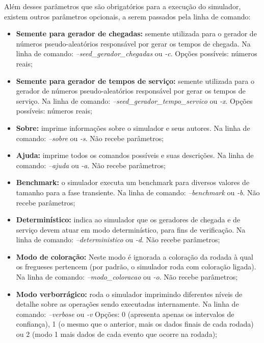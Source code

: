 \documentclass[a4paper,10pt]{article}
\begin{document}
    Além desses parâmetros que são obrigatórios para a execução do simulador, existem outros parâmetros opcionais, a serem passados pela linha de comando:

\begin {itemize}
\item \textbf{Semente para gerador de chegadas:} semente utilizada para o gerador de números pseudo-aleatórios responsável por gerar os tempos de chegada. Na linha de comando: \emph{--seed\_gerador\_chegadas} ou \emph{-c}. Opções possíveis: números reais;

\item \textbf{Semente para gerador de tempos de serviço:} semente utilizada para o gerador de números pseudo-aleatórios responsável por gerar os tempos de serviço. Na linha de comando: \emph{--seed\_gerador\_tempo\_servico} ou \emph{-x}. Opções possíveis: números reais;

\item \textbf{Sobre:} imprime informações sobre o simulador e seus autores. Na linha de comando: \emph{--sobre} ou \emph{-s}. Não recebe parâmetros;

\item \textbf{Ajuda:} imprime todos os comandos possíveis e suas descrições. Na linha de comando: \emph{--ajuda} ou \emph{-a}. Não recebe parâmetros;

\item \textbf{Benchmark:} o simulador executa um benchmark para diversos valores de tamanho para a fase transiente. Na linha de comando: \emph{--benchmark} ou \emph{-b}. Não recebe parâmetros;

\item \textbf{Determinístico:} indica ao simulador que os geradores de chegada e de serviço devem atuar em modo determinístico, para fins de verificação. Na linha de comando: \emph{--deterministico} ou \emph{-d}. Não recebe parâmetros;

\item \textbf{Modo de coloração:} Neste modo é ignorada a coloração da rodada à qual os fregueses pertencem (por padrão, o simulador roda com coloração ligada). Na linha de comando: \emph{--modo\_coloracao} ou \emph{-o}. Não recebe parâmetros;


\item \textbf{Modo verborrágico:} roda o simulador imprimindo diferentes níveis de detalhe sobre as operações sendo executadas internamente. Na linha de comando: \emph{--verbose} ou \emph{-v} Opções: 0 (apresenta apenas os intervalos de confiança), 1 (o mesmo que o anterior, mais os dados finais de cada rodada) ou 2 (modo 1 mais dados de cada evento que ocorre na rodada);
\end {itemize}
\end{document}
